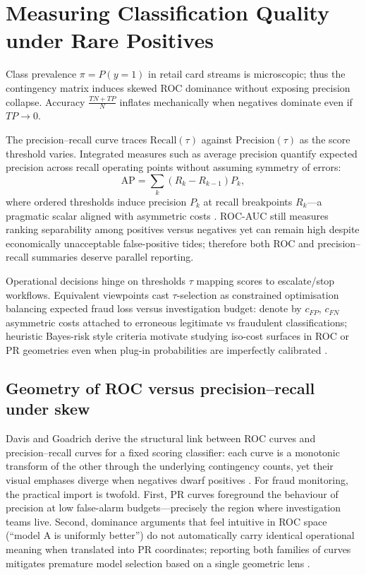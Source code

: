 \section{Measuring Classification Quality under Rare Positives}
Class prevalence $\pi=P(y{=}1)$ in retail card streams is microscopic; thus the contingency matrix induces skewed ROC dominance without exposing precision collapse. Accuracy $\frac{TN+TP}{N}$ inflates mechanically when negatives dominate even if $TP\to0$.

The precision--recall curve traces $\text{Recall}(\tau)$ against $\text{Precision}(\tau)$ as the score threshold varies. Integrated measures such as average precision quantify expected precision across recall operating points without assuming symmetry of errors:
\begin{equation}
\text{AP} = \sum_{k} (R_k-R_{k-1}) P_k ,
\end{equation}
where ordered thresholds induce precision $P_k$ at recall breakpoints $R_k$---a pragmatic scalar aligned with asymmetric costs \cite{fraud_handbook}. ROC-AUC still measures ranking separability among positives versus negatives yet can remain high despite economically unacceptable false-positive tides; therefore both ROC and precision--recall summaries deserve parallel reporting.

Operational decisions hinge on thresholds $\tau$ mapping scores to escalate/stop workflows. Equivalent viewpoints cast $\tau$-selection as constrained optimisation balancing expected fraud loss versus investigation budget: denote by $c_{FP}$, $c_{FN}$ asymmetric costs attached to erroneous legitimate vs fraudulent classifications; heuristic Bayes-risk style criteria motivate studying iso-cost surfaces in ROC or PR geometries even when plug-in probabilities are imperfectly calibrated \cite{fraud_handbook}.

\subsection{Geometry of ROC versus precision--recall under skew}
Davis and Goadrich derive the structural link between ROC curves and precision--recall curves for a fixed scoring classifier: each curve is a monotonic transform of the other through the underlying contingency counts, yet their visual emphases diverge when negatives dwarf positives \cite{davis_goadrich_icml06}. For fraud monitoring, the practical import is twofold. First, PR curves foreground the behaviour of precision at low false-alarm budgets—precisely the region where investigation teams live. Second, dominance arguments that feel intuitive in ROC space (``model A is uniformly better'') do not automatically carry identical operational meaning when translated into PR coordinates; reporting both families of curves mitigates premature model selection based on a single geometric lens \cite{davis_goadrich_icml06,fraud_handbook}.


